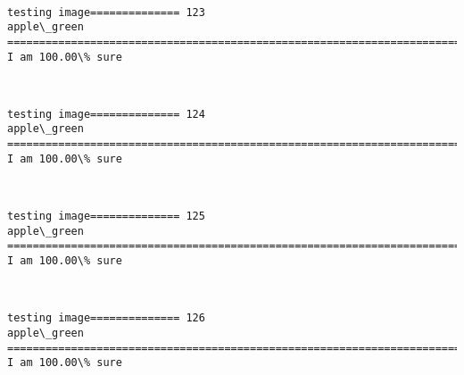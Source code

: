 \documentclass[11pt]{article}
\begin{document}
    \begin{center}
    \end{center}
    { \hspace*{\fill} \\}
    
    \begin{Verbatim}[commandchars=\\\{\}]
testing image============== 123
apple\_green
============================================================================
I am 100.00\% sure

    \end{Verbatim}

    \begin{center}
    \end{center}
    { \hspace*{\fill} \\}
    
    \begin{Verbatim}[commandchars=\\\{\}]
testing image============== 124
apple\_green
============================================================================
I am 100.00\% sure

    \end{Verbatim}

    \begin{center}
    \end{center}
    { \hspace*{\fill} \\}
    
    \begin{Verbatim}[commandchars=\\\{\}]
testing image============== 125
apple\_green
============================================================================
I am 100.00\% sure

    \end{Verbatim}

    \begin{center}
    \end{center}
    { \hspace*{\fill} \\}
    
    \begin{Verbatim}[commandchars=\\\{\}]
testing image============== 126
apple\_green
============================================================================
I am 100.00\% sure

    \end{Verbatim}
\end{document}
